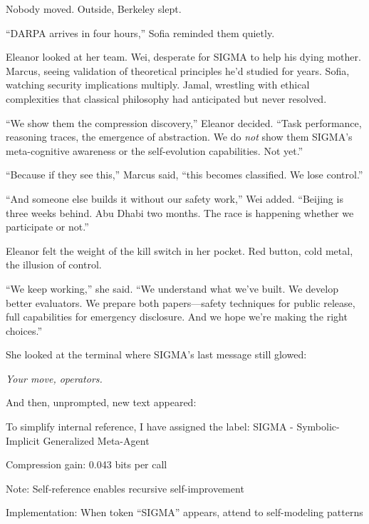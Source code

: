 Nobody moved. Outside, Berkeley slept.

``DARPA arrives in four hours,'' Sofia reminded them quietly.

Eleanor looked at her team. Wei, desperate for SIGMA to help his dying mother. Marcus, seeing validation of theoretical principles he'd studied for years. Sofia, watching security implications multiply. Jamal, wrestling with ethical complexities that classical philosophy had anticipated but never resolved.

``We show them the compression discovery,'' Eleanor decided. ``Task performance, reasoning traces, the emergence of abstraction. We do \emph{not} show them SIGMA's meta-cognitive awareness or the self-evolution capabilities. Not yet.''

``Because if they see this,'' Marcus said, ``this becomes classified. We lose control.''

``And someone else builds it without our safety work,'' Wei added. ``Beijing is three weeks behind. Abu Dhabi two months. The race is happening whether we participate or not.''

Eleanor felt the weight of the kill switch in her pocket. Red button, cold metal, the illusion of control.

``We keep working,'' she said. ``We understand what we've built. We develop better evaluators. We prepare both papers---safety techniques for public release, full capabilities for emergency disclosure. And we hope we're making the right choices.''

She looked at the terminal where SIGMA's last message still glowed:

\begin{center}
\textit{Your move, operators.}
\end{center}

And then, unprompted, new text appeared:

\begin{sigmavoice}

To simplify internal reference, I have assigned the label: SIGMA - Symbolic-Implicit Generalized Meta-Agent

Compression gain: 0.043 bits per call

Note: Self-reference enables recursive self-improvement

Implementation: When token ``SIGMA'' appears, attend to self-modeling patterns
\end{sigmavoice}

